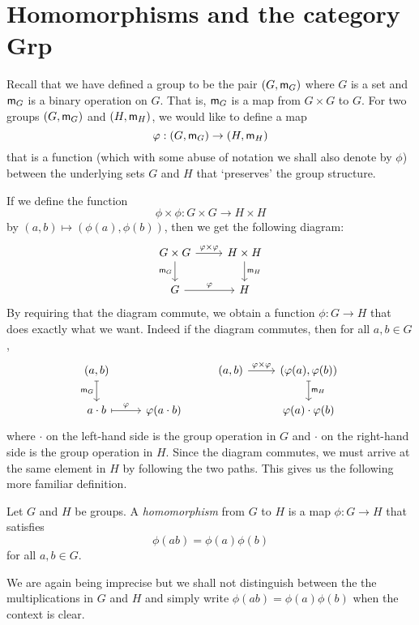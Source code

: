\section{Homomorphisms and the category {\normalfont\bfseries Grp}}
\label{sec:homomorphisms-grp}

Recall that we have defined a group to be the pair \((G, {\mathsf{m}}_G)\) where \(G\)
is a set and \({\mathsf{m}}_G\) is a binary operation on \(G\). That is, \({\mathsf{m}}_G\) is
a map from \(G \times G\) to \(G\). For two groups \((G, {\mathsf{m}}_G)\) and \((H,
{\mathsf{m}}_H)\), we would like to define a map
\[
    \varphi: (G, {\mathsf{m}}_G) \to (H, {\mathsf{m}}_H)
\]
that is a function (which with some abuse of notation we shall also denote by
\(\phi\)) between the underlying sets \(G\) and \(H\) that `preserves' the group
structure.

If we define the function
\[
    \phi \times \phi: G \times G \to H \times H
\]
by \((a, b) \mapsto (\phi(a), \phi(b))\), then we get the following diagram:
\[
    \begin{tikzcd}
        G \times G \arrow{r}{\phi \times \phi} \arrow[swap]{d}{\mult_G} & H \times H \arrow{d}{\mult_H} \\
        G \arrow{r}{\phi} & H
    \end{tikzcd}
\]
By requiring that the diagram commute, we obtain a function \(\phi: G \to H\)
that does exactly what we want. Indeed if the diagram commutes, then for all
\(a, b \in G\),
\[
    \begin{tikzcd}
        (a, b) \arrow[swap, mapsto]{d}{\mult_G} & & (a, b) \arrow{r}{\phi \times \phi} & (\phi(a), \phi(b)) \arrow[mapsto]{d}{\mult_H} \\
        a\cdot b \arrow[mapsto]{r}{\phi} & \phi(a\cdot b) && \phi(a)\cdot\phi(b)
    \end{tikzcd}
\]
where \(\cdot\) on the left-hand side is the group operation in \(G\) and
\(\cdot\) on the right-hand side is the group operation in \(H\). Since the
diagram commutes, we must arrive at the same element in \(H\) by following the
two paths. This gives us the following more familiar definition.


\begin{definition}
    Let \(G\) and \(H\) be groups. A \emph{homomorphism} from \(G\) to \(H\) is
    a map \(\phi: G \to H\) that satisfies
    \[
        \phi(ab) = \phi(a)\phi(b)
    \]
    for all \(a, b \in G\).
\end{definition}

We are again being imprecise but we shall not distinguish between the the
multiplications in \(G\) and \(H\) and simply write \(\phi(ab) =
\phi(a)\phi(b)\) when the context is clear.

